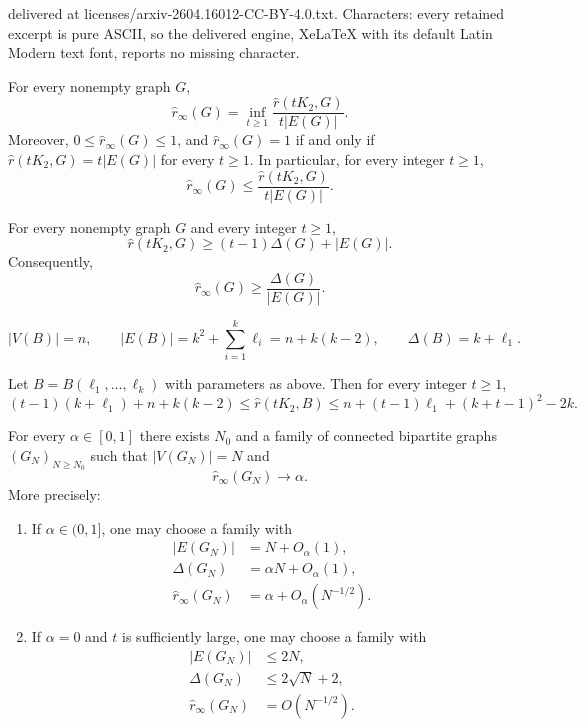 \documentclass[10pt,a4paper]{amsart}
\newcommand{\sr}{\hat r}
\newcommand{\sri}{\hat r_{\infty}}
\begin{document}
delivered at licenses/arxiv-2604.16012-CC-BY-4.0.txt. Characters: every retained excerpt is pure ASCII, so the delivered engine, XeLaTeX with its default Latin Modern text font, reports no missing character.
\begin{corollary}\label{cor:fekete-reduction}
For every nonempty graph $G$,
\[
\sri(G)=\inf_{t\ge 1}\frac{\sr(tK_2,G)}{t|E(G)|}.
\]
Moreover,
$0 \le \sri(G)\le 1$,
and
$\sri(G)=1$
if and only if 
$\sr(tK_2,G)=t|E(G)|$
for every $t\ge 1$.
In particular, for every integer $t\ge 1$,
\[
\sri(G)\le \frac{\sr(tK_2,G)}{t|E(G)|}.
\]
\end{corollary}

\begin{proposition}\label{prop:delta-lower}
For every nonempty graph $G$ and every integer $t\ge 1$,
\[
\sr(tK_2,G)\ge (t-1)\Delta(G)+|E(G)|.
\]
Consequently,
\[
\sri(G)\ge \frac{\Delta(G)}{|E(G)|}.
\]
\end{proposition}

\begin{equation}\label{eq:basic-params}
|V(B)|=n,
\qquad
|E(B)|=k^2+\sum_{i=1}^k\ell_i=n+k(k-2),
\qquad
\Delta(B)=k+\ell_1.
\end{equation}

\begin{proposition}
\label{prop:bundle-bounds}
Let $B=B(\ell_1,\dots,\ell_k)$ with parameters as above. Then for every integer $t\ge 1$,
\[
(t-1)(k+\ell_1)+n+k(k-2)
\le
\sr(tK_2,B)
\le
n+(t-1)\ell_1+(k+t-1)^2-2k.
\]
\end{proposition}

\begin{theorem}\label{thm:connected-classification}
For every $\alpha\in[0,1]$ there exists $N_0$ and a family of connected bipartite graphs
$(G_N)_{N\ge N_0}$ such that $|V(G_N)|=N$ and
\[
\sri(G_N)\to \alpha.
\]
More precisely:
\begin{enumerate}[label={\rm (\roman*)}]
\item If $\alpha\in(0,1]$, one may choose a family with
\[
\begin{aligned}
|E(G_N)|&=N+O_{\alpha}(1),\\
\Delta(G_N)&=\alpha N+O_{\alpha}(1),\\
\sri(G_N)&=\alpha+O_{\alpha}(N^{-1/2}).
\end{aligned}
\]
\item If $\alpha=0$ and $t$ is sufficiently large, one may choose a family with
\[
\begin{aligned}
|E(G_N)|&\le 2N,\\
\Delta(G_N)&\le 2\sqrt N+2,\\
\sri(G_N)&=O(N^{-1/2}).
\end{aligned}
\]
\end{enumerate}
\end{theorem}
\end{document}
